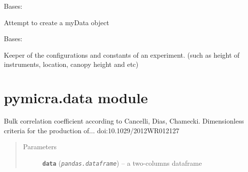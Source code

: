 \documentclass[a4paper,10pt,oneside]{sphinxmanual}
\begin{document}

\begin{fulllineitems}
\label{pymicra:pymicra.core.myData}
Bases: 

Attempt to create a myData object

\end{fulllineitems}


\begin{fulllineitems}
\label{pymicra:pymicra.core.siteConfig}
Bases: 

Keeper of the configurations and constants of an experiment. (such as height of instruments,
location, canopy height and etc)

\end{fulllineitems}



\section{pymicra.data module}
\label{pymicra:pymicra-data-module}\label{pymicra:module-pymicra.data}

\begin{fulllineitems}
\label{pymicra:pymicra.data.bulkCorr}
Bulk correlation coefficient according to
Cancelli, Dias, Chamecki. Dimensionless criteria for the production of...
doi:10.1029/2012WR012127
\begin{quote}\begin{description}
\item[{Parameters}] \leavevmode
\textbf{\texttt{data}} (\emph{\texttt{pandas.dataframe}}) -- a two-columns dataframe

\end{description}\end{quote}

\end{fulllineitems}

\end{document}
